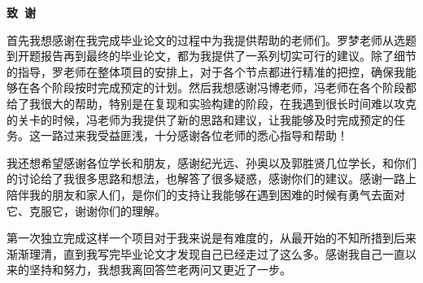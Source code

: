 \cleardoublepage{}
\begin{center}
    \bfseries {} 致~谢
\end{center}

首先我想感谢在我完成毕业论文的过程中为我提供帮助的老师们。罗梦老师从选题到开题报告再到最终的毕业论文，都为我提供了一系列切实可行的建议。除了细节的指导，罗老师在整体项目的安排上，对于各个节点都进行精准的把控，确保我能够在各个阶段按时完成预定的计划。然后我想感谢冯博老师，冯老师在各个阶段都给了我很大的帮助，特别是在复现和实验构建的阶段，在我遇到很长时间难以攻克的关卡的时候，冯老师为我提供了新的思路和建议，让我能够及时完成预定的任务。这一路过来我受益匪浅，十分感谢各位老师的悉心指导和帮助！

我还想希望感谢各位学长和朋友，感谢纪光远、孙奥以及郭胜贤几位学长，和你们的讨论给了我很多思路和想法，也解答了很多疑惑，感谢你们的建议。感谢一路上陪伴我的朋友和家人们，是你们的支持让我能够在遇到困难的时候有勇气去面对它、克服它，谢谢你们的理解。

第一次独立完成这样一个项目对于我来说是有难度的，从最开始的不知所措到后来渐渐理清，直到我写完毕业论文才发现自己已经走过了这么多。感谢我自己一直以来的坚持和努力，我想我离回答竺老两问又更近了一步。
